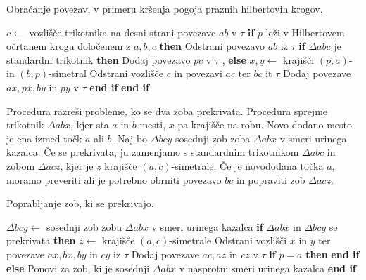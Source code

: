 \documentclass{article}
\begin{document}
\begin{algorithm}
    \caption{Obračanje povezav, v primeru kršenja pogoja praznih hilbertovih krogov.}
    \label{alg:obracanje}
    \begin{algorithmic}
        \State $c \leftarrow$ vozlišče trikotnika na desni strani povezave $ab$ v $\tau$
        \State \textbf{if} $p$ leži v Hilbertovem očrtanem krogu določenem z $a, b, c$ \textbf{then}
        \State \qquad Odstrani povezavo $ab$ iz $\tau$
        \State \qquad \textbf{if} $\Delta abc$ je standardni trikotnik \textbf{then}
        \State \qquad \qquad Dodaj povezavo $pc$ v $\tau$
        \State \qquad \qquad {}, 
        \State \qquad \textbf{else}
        \State \qquad \qquad $x, y \leftarrow$ krajišči $(p, a)$- in $(b, p)$-simetral
        \State \qquad \qquad Odstrani vozlišče $c$ in povezavi $ac$ ter $bc$ it $\tau$
        \State \qquad \qquad Dodaj povezave $ax, px, by$ in $py$ v $\tau$
        \State \qquad \textbf{end if}
        \State \textbf{end if}
    \EndProcedure
    \end{algorithmic}
\end{algorithm}

Procedura  razreši probleme, ko se dva zoba prekrivata. Procedura sprejme trikotnik $\Delta abx$, kjer sta $a$ in $b$ mesti, $x$ pa krajišče na robu. Novo dodano mesto je ena izmed točk $a$ ali $b$.
Naj bo $\Delta bcy$ sosednji zob zoba $\Delta abx$ v smeri urinega kazalca. Če se prekrivata, ju zamenjamo s standardnim trikotnikom $\Delta abc$ in zobom $\Delta acz$, kjer je $z$ krajišče $(a, c)$-simetrale.
Če je novododana točka $a$, moramo preveriti ali je potrebno obrniti povezavo $bc$ in popraviti zob $\Delta acz$.

\begin{algorithm}
    \caption{Poprabljanje zob, ki se prekrivajo.}
    \label{alg:obracanje}
    \begin{algorithmic}
        \State $\Delta bcy \leftarrow$ sosednji zob zobu $\Delta abx$ v smeri urinega kazalca 
        \State \textbf{if} $\Delta abx$ in $\Delta bcy$ se prekrivata \textbf{then}
        \State \qquad $z \leftarrow$ krajišče $(a, c)$-simetrale
        \State \qquad Odstrani vozlišči $x$ in $y$ ter povezave $ax, bx, by$ in $cy$ iz $\tau$
        \State \qquad Dodaj povezave $ac, az$ in $cz$ v $\tau$
        \State \qquad \textbf{if} $p = a$ \textbf{then}
        \State \qquad \qquad {}
        \State \qquad \qquad {}
        \State \qquad \textbf{end if}
        \State \textbf{else}
        \State \qquad Ponovi za zob, ki je sosednji $\Delta abx$ v nasprotni smeri urinega kazalca
        \State \textbf{end if}
    \EndProcedure
    \end{algorithmic}
\end{algorithm}
\end{document}
